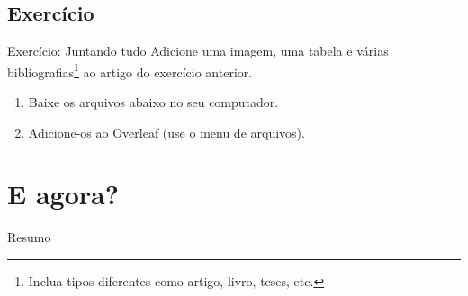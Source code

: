 \documentclass{beamer}
\begin{document}
\subsection{Exercício}
\begin{frame}[fragile]{Exercício: Juntando tudo}
Adicione uma imagem, uma tabela  e várias bibliografias\footnote{Inclua tipos diferentes como artigo, livro, teses, etc.} ao artigo do exercício anterior.
\begin{enumerate}
  \item Baixe os arquivos abaixo no seu computador.
  \begin{center}
  \end{center}
  \item Adicione-os ao  Overleaf (use o menu de arquivos).
\end{enumerate}
\end{frame}

\section{E agora?}

\begin{frame}{Resumo}
\begin{multicols}{2}
\tableofcontents[currentsection]
\end{multicols}
\end{frame}

\end{document}
